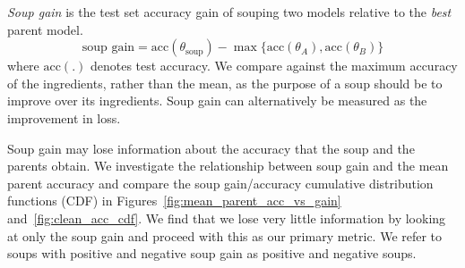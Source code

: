 \emph{Soup gain} is the test set accuracy gain of souping two models relative to the \emph{best} parent model. 
$$\text{soup gain} = \text{acc}(\theta_{\text{soup}}) - \max\{\text{acc}(\theta_A), \text{acc}(\theta_B)\}$$
where $\text{acc}(.)$ denotes test accuracy. We compare against the maximum accuracy of the ingredients, rather than the mean, as the purpose of a soup should be to improve over its ingredients. Soup gain can alternatively be measured as the improvement in loss. 

Soup gain may lose information about the accuracy that the soup and the parents obtain. We investigate the relationship between soup gain and the mean parent accuracy and compare the soup gain/accuracy cumulative distribution functions (CDF) in Figures~\ref{fig:mean_parent_acc_vs_gain} and~\ref{fig:clean_acc_cdf}. We find that we lose very little information by looking at only the soup gain and proceed with this as our primary metric. We refer to soups with positive and negative soup gain as positive and negative soups. 